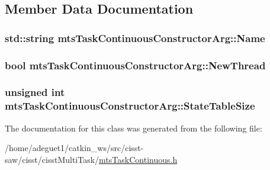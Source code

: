 \subsection{Member Data Documentation}
\hypertarget{classmts_task_continuous_constructor_arg_a93d1c4dea258e4b415ecfc0d4a82d379}{
\subsubsection[{Name}]{\setlength{\rightskip}{0pt plus 5cm}std\-::string mts\-Task\-Continuous\-Constructor\-Arg\-::\-Name}}\label{classmts_task_continuous_constructor_arg_a93d1c4dea258e4b415ecfc0d4a82d379}
\hypertarget{classmts_task_continuous_constructor_arg_aa49a5e6b6c0d56a38a87419604a40210}{
\subsubsection[{New\-Thread}]{\setlength{\rightskip}{0pt plus 5cm}bool mts\-Task\-Continuous\-Constructor\-Arg\-::\-New\-Thread}}\label{classmts_task_continuous_constructor_arg_aa49a5e6b6c0d56a38a87419604a40210}
\hypertarget{classmts_task_continuous_constructor_arg_a45645886b95b25b5727488c7d335b2cf}{
\subsubsection[{State\-Table\-Size}]{\setlength{\rightskip}{0pt plus 5cm}unsigned int mts\-Task\-Continuous\-Constructor\-Arg\-::\-State\-Table\-Size}}\label{classmts_task_continuous_constructor_arg_a45645886b95b25b5727488c7d335b2cf}


The documentation for this class was generated from the following file\-:\begin{DoxyCompactItemize}
\item 
/home/adeguet1/catkin\-\_\-ws/src/cisst-\/saw/cisst/cisst\-Multi\-Task/\hyperlink{mts_task_continuous_8h}{mts\-Task\-Continuous.\-h}\end{DoxyCompactItemize}
